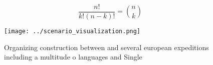\documentclass[a4paper]{article}
\begin{document}
\[ \frac{n!}{k!(n-k)!} = \binom{n}{k} \]

\begin{figure}
\centering
\texttt{[image: ../scenario\_visualization.png]}
\caption{Organizing construction between and several european expeditions including a multitude o languages and Single
}
\end{figure}
 
\end{document}
